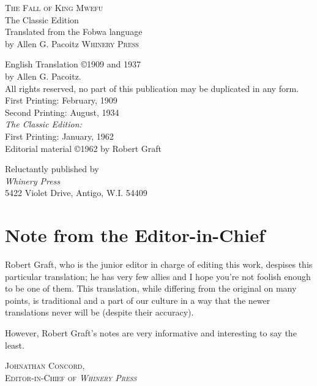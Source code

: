 \documentclass[openleft, twoside, 14pt, extrafontsizes]{memoir}
\begin{document}
\frontmatter

\pagestyle{empty}

\begin{center}
\textsc{\LARGE The Fall of King Mwefu}\\
\large The Classic Edition\\[1.5cm]
Translated from the Fo\-bwa language\\ by Allen G. Pacoitz
\null\vfill
\textsc{Whinery Press}
\end{center}

\break
\null

\break
\null\vfill
\small
{
\noindent
English Translation \copyright 1909 and 1937\\by Allen G. Pacoitz.\\[0.3cm]
All rights reserved, no part of this publication may be duplicated in any form.\\[1.5cm]

\noindent
First Printing: February, 1909\\
Second Printing: August, 1934\\[0.5cm]

\noindent
\emph{The Classic Edition:} \\
First Printing: January, 1962\\
Editorial material \copyright 1962 by Robert Graft\\[2cm]
}

\noindent
Reluctantly published by\\
\emph{Whinery Press} \\
5422 Violet Drive, Antigo, W.I. 54409

\pagestyle{plain}

\chapter*{Note from the Editor-in-Chief}
Robert Graft, who is the junior editor in charge of editing this work, despises this particular translation; he has very few allies and I hope you're not foolish enough to be one of them. This translation, while differing from the original on many points, is traditional and a part of our culture in a way that the newer translations never will be (despite their accuracy).

However, Robert Graft's notes are very informative and interesting to say the least.
\begin{flushright}
\textsc{
Johnathan Concord,\\
Editor-in-Chief of \emph{Whinery Press}}
\clearpage
\end{flushright}
\end{document}

